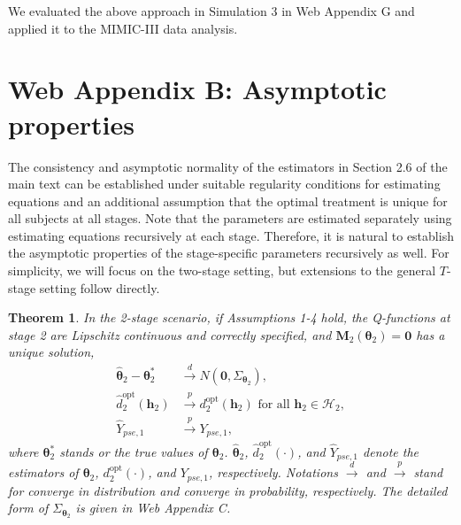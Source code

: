 \documentclass[12pt]{article}
\newtheorem{theorem}{Theorem}
\begin{document}
We evaluated the above approach in Simulation 3 in Web Appendix G and applied it to the MIMIC-III data analysis.%






\section{Web Appendix B: Asymptotic properties}

The consistency and asymptotic normality of the estimators in Section 2.6 of the main text  can be established under suitable regularity conditions for estimating equations and an additional assumption that the optimal treatment is unique for all subjects at all stages. Note that the parameters are estimated separately using estimating equations recursively at each stage. Therefore, it is natural to establish the asymptotic properties of the stage-specific parameters recursively as well. For simplicity, we will focus on the two-stage setting, but extensions to the general $T$-stage setting follow directly. 

\begin{theorem}
In the 2-stage scenario, if Assumptions 1-4 hold, the Q-functions at stage 2 are Lipschitz continuous and correctly specified, and $\bm{M}_2(\bm{\theta}_2) = \bm{0}$ has a unique solution, %
\begin{align*}
    \widehat{\bm{\theta}}_2 - \bm{\theta}_{2}^* &\stackrel{d}{\longrightarrow} N(\bm{0}, \Sigma_{\bm{\theta}_2}) , \\
    \widehat{d}_2^{\mathrm{opt}}(\bm{h}_2) & \stackrel{p}{\longrightarrow} d_2^{\mathrm{opt}}(\bm{h}_2) \text{ for all } \bm{h}_2 \in \mathcal{H}_2,\\
    \widehat{Y}_{pse,1}  &\stackrel{p}{\longrightarrow} Y_{pse,1},
\end{align*}
where $\bm{\theta}_{2}^*$ stands or the true values of $\bm{\theta}_{2}$. $\widehat{\bm{\theta}}_{2}$, $\widehat{d}_{2}^{\mathrm{opt}}(\cdot)$, and $\widehat{Y}_{pse,1}$ denote the estimators of $\bm{\theta}_{2}$, $d_2^{\mathrm{opt}}(\cdot)$, and $Y_{pse,1}$, respectively. Notations $\stackrel{d}{\longrightarrow}$ and  $\stackrel{p}{\longrightarrow}$ stand for converge in distribution and converge in probability, respectively. The detailed form of $\Sigma_{\bm{\theta}_2}$ is given in Web Appendix  C.
\end{theorem}
\end{document}
